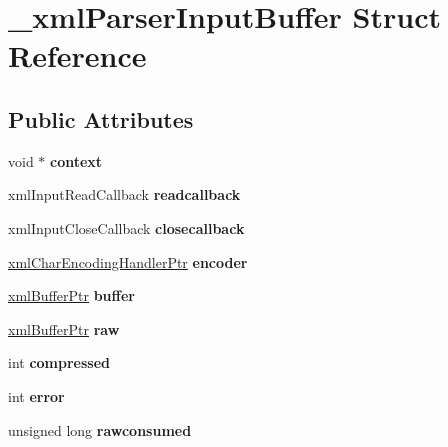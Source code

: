 \hypertarget{struct__xml_parser_input_buffer}{}\section{\+\_\+xml\+Parser\+Input\+Buffer Struct Reference}
\label{struct__xml_parser_input_buffer}
\subsection*{Public Attributes}
\begin{DoxyCompactItemize}
\item 
\mbox{\label{struct__xml_parser_input_buffer_a6396a2f2ac55266f0b1bf01d6230d475}} 
void $\ast$ {\bfseries context}
\item 
\mbox{\label{struct__xml_parser_input_buffer_a69f574b183e3acafcfb08e97370ca38a}} 
xml\+Input\+Read\+Callback {\bfseries readcallback}
\item 
\mbox{\label{struct__xml_parser_input_buffer_a2da9a3f7231857d19ac2ee41c61dfee2}} 
xml\+Input\+Close\+Callback {\bfseries closecallback}
\item 
\mbox{\label{struct__xml_parser_input_buffer_af72974d4e9a48cdbd29c5071d07f3d69}} 
\mbox{\hyperlink{struct__xml_char_encoding_handler}{xml\+Char\+Encoding\+Handler\+Ptr}} {\bfseries encoder}
\item 
\mbox{\label{struct__xml_parser_input_buffer_acfa649a4c5dcaff889c49c885ea02af7}} 
\mbox{\hyperlink{struct__xml_buffer}{xml\+Buffer\+Ptr}} {\bfseries buffer}
\item 
\mbox{\label{struct__xml_parser_input_buffer_a5a75f422c4d6a4d5a4c7da12b7564bfe}} 
\mbox{\hyperlink{struct__xml_buffer}{xml\+Buffer\+Ptr}} {\bfseries raw}
\item 
\mbox{\label{struct__xml_parser_input_buffer_aa17c64fa46053ce3e42ac219d15418d4}} 
int {\bfseries compressed}
\item 
\mbox{\label{struct__xml_parser_input_buffer_a5759b0b008b6fda05e9e850ed7bea149}} 
int {\bfseries error}
\item 
\mbox{\label{struct__xml_parser_input_buffer_a1a63d0654d57e0d2a7ba52a06dc35b4a}} 
unsigned long {\bfseries rawconsumed}
\end{DoxyCompactItemize}


